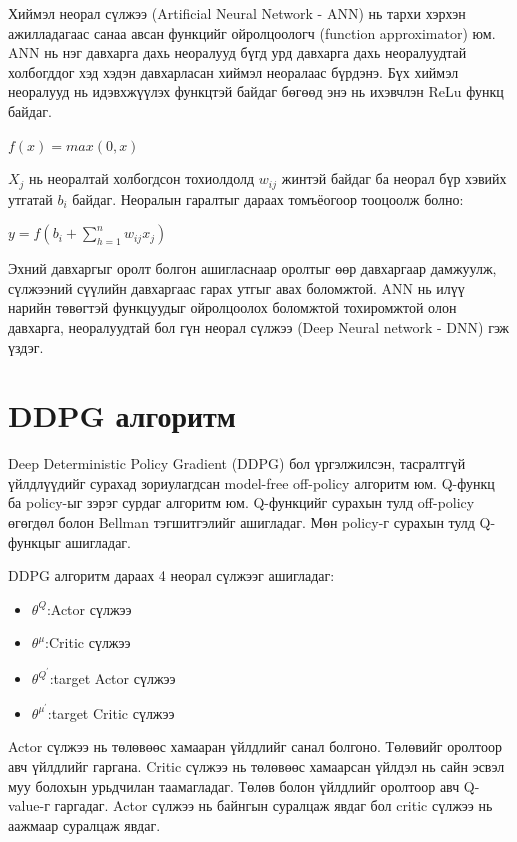 \documentclass[12pt,A4]{report}
\begin{document}
Хиймэл неорал сүлжээ (Artificial Neural Network - ANN) нь тархи хэрхэн ажилладагаас санаа авсан функцийг ойролцоологч (function approximator) юм. ANN нь нэг давхарга дахь неоралууд бүгд урд давхарга дахь неоралуудтай холбогддог хэд хэдэн давхарласан хиймэл неоралаас бүрдэнэ. Бүх хиймэл неоралууд нь идэвхжүүлэх функцтэй байдаг бөгөөд энэ нь ихэвчлэн ReLu функц байдаг. 

\begin{center}
$f(x)=max(0, x)$
\end{center}

$X_j$ нь неоралтай холбогдсон тохиолдолд $w_{ij}$ жинтэй байдаг ба неорал бүр хэвийх утгатай $b_i$ байдаг. Неоралын гаралтыг дараах томъёогоор тооцоолж болно:

\begin{center}
$y=f(b_i+\sum_{h=1}^{n}w_{ij} x_j)$
\end{center}

Эхний давхаргыг оролт болгон ашигласнаар оролтыг өөр давхаргаар дамжуулж, сүлжээний сүүлийн давхаргаас гарах утгыг авах боломжтой. ANN нь илүү нарийн төвөгтэй функцуудыг ойролцоолох боломжтой тохиромжтой олон давхарга, неоралуудтай бол гүн неорал сүлжээ (Deep Neural network - DNN) гэж үздэг. 

\section{DDPG алгоритм}

Deep Deterministic Policy Gradient (DDPG) бол үргэлжилсэн, тасралтгүй үйлдлүүдийг сурахад зориулагдсан model-free off-policy алгоритм юм. Q-функц ба policy-ыг зэрэг сурдаг алгоритм юм. Q-функцийг сурахын тулд off-policy өгөгдөл болон Bellman тэгшитгэлийг ашигладаг. Мөн policy-г сурахын тулд Q-функцыг ашигладаг. 

DDPG алгоритм дараах 4 неорал сүлжээг ашигладаг:
\begin{itemize}
	\item ${\theta}^Q$:Actor сүлжээ
	\item ${\theta}^{\mu}$:Critic сүлжээ
	\item ${\theta}^{Q^{'}}$:target Actor сүлжээ
	\item ${\theta}^{{\mu}^{'}}$:target Critic сүлжээ
\end{itemize} 
 
Actor сүлжээ нь төлөвөөс хамааран үйлдлийг санал болгоно. Төлөвийг оролтоор авч үйлдлийг гаргана. Critic сүлжээ нь төлөвөөс хамаарсан үйлдэл нь сайн эсвэл муу болохын урьдчилан таамагладаг. Төлөв болон үйлдлийг оролтоор авч Q-value-г гаргадаг. Actor сүлжээ нь байнгын суралцаж явдаг бол critic сүлжээ нь аажмаар суралцаж явдаг.
\end{document}
